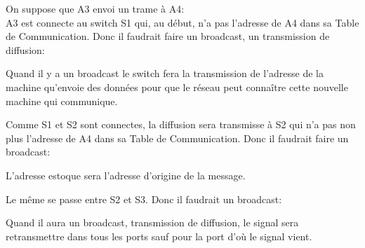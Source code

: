 \documentclass{article}
\begin{document}
\newpage
\begin{resolution}
    On suppose que A3 envoi un trame à A4:\\

    A3 est connecte au switch S1 qui, au début, n'a pas l'adresse de A4 dans sa Table de Communication. Donc il faudrait faire un broadcast, un transmission de diffusion:
    \begin{remark}
        Quand il y a un broadcast le switch fera la transmission de l'adresse de la machine qu'envoie des données pour que le réseau peut connaître cette nouvelle machine qui communique.
    \end{remark}
    Comme S1 et S2 sont connectes, la diffusion sera transmisse à S2 qui n'a pas non plus l'adresse de A4 dans sa Table de Communication. Donc il faudrait faire un broadcast:
    \begin{remark}
        L'adresse estoque sera l'adresse d'origine de la message.
    \end{remark}
    Le même se passe entre S2 et S3. Donc il faudrait un broadcast:
    \begin{remark}
        Quand il aura un broadcast, transmission de diffusion, le signal sera retransmettre dans tous les ports sauf pour la port d'où le signal vient.
    \end{remark}
\end{resolution}

\newpage
\end{document}
